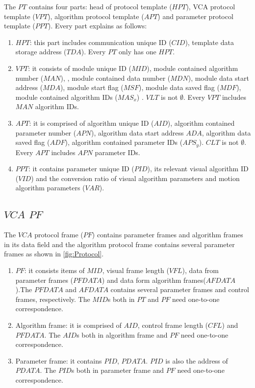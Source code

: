 \documentclass[journal,UTF8]{IEEEtran}
\begin{document}
 The $PT$ contains four parts: head of protocol template ($HPT$), VCA protocol template ($VPT$), algorithm protocol template ($APT$) and parameter protocol template ($PPT$). Every part explains as follows: 
 \begin{enumerate}
 	\item $HPT$: this part includes communication unique ID ($CID$), template data storage address ($TDA$). Every $PT$ only has one $HPT$.
 	\item $VPT$: it consists of module unique ID ($MID$), module contained algorithm number ($MAN$), , module contained data number ($MDN$), module data start address ($MDA$), module start flag ($MSF$), module data saved flag ($MDF$), module contained algorithm IDs ($MAS_x$) . $VLT$ is not $\emptyset$. Every $VPT$ includes $MAN$ algorithm IDs. 
 	\item $APT$: it is comprised of algorithm unique ID ($AID$), algorithm contained parameter number ($APN$), algorithm data start address $ADA$, algorithm data saved flag ($ADF$), algorithm contained parameter IDs ($APS_y$). $CLT$ is not $\emptyset$. Every $APT$ includes $APN$ parameter IDs.
 	\item $PPT$: it contains parameter unique ID ($PID$), its relevant visual algorithm ID ($VID$) and the conversion ratio of visual algorithm parameters and motion algorithm parameters ($VAR$).  
 \end{enumerate}
 \subsection{$VCA$ $PF$}
 The $VCA$ protocol frame ($PF$) contains parameter frames and algorithm frames in its data field and the algorithm protocol frame contains several parameter frames as shown in \ref{fig:Protocol}. 

 \begin{enumerate}
	\item $PF$: it consists items of $MID$, visual frame length ($VFL$), data from parameter frames ($PFDATA$) and data form algorithm frames($AFDATA$).The $PFDATA$ and $AFDATA$ contains several parameter frames and control frames, respectively. The $MID$s both in $PT$ and $PF$ need one-to-one correspondence.
	\item Algorithm frame: it is comprised of $AID$, control frame length ($CFL$) and $PFDATA$. The $AID$s both in algorithm frame and $PF$ need one-to-one correspondence.
	\item Parameter frame: it contains $PID$, $PDATA$. $PID$ is also the address of $PDATA$. The $PID$s both in parameter frame and $PF$ need one-to-one correspondence.
\end{enumerate}
\end{document}
